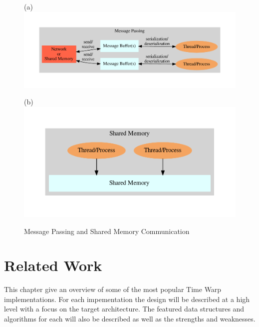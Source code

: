 \documentclass[11pt]{book}
\begin{document}
\begin{figure}
  \begin{minipage}{.5\textwidth}
    \begin{center}
      (a)
      \includegraphics[width=\textwidth,keepaspectratio,quiet]{figs/graphviz/message_passing.pdf}
    \end{center}  
  \end{minipage}%
  \hfill
  \begin{minipage}{.5\textwidth}
    \begin{center}
      (b) 
      \includegraphics[width=\textwidth,keepaspectratio,quiet]{figs/graphviz/shared_memory.pdf}
    \end{center}  
  \end{minipage}
  \caption{Message Passing and Shared Memory Communication}\label{communication}
\end{figure}



\chapter{Related Work}\label{related_work}

This chapter give an overview of some of the most popular Time Warp implementations.  For
each impementation the design will be described at a high level with a focus on the target
architecture.  The featured data structures and algorithms for each will also be described
as well as the strengths and weaknesses.
\end{document}
